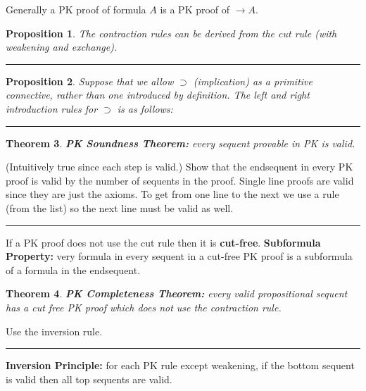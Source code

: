 \documentclass[twoside]{article}
\newcounter{lecnum}
\newtheorem{theorem}{Theorem}[lecnum]
\newtheorem{proposition}[theorem]{Proposition}
\newenvironment{proof}{{\bf Proof:}}{\hfill\rule{2mm}{2mm}}
\begin{document}
Generally a PK proof of formula $A$ is a PK proof of $\rightarrow A$. 

\begin{proposition}
The contraction rules can be derived from the cut rule (with weakening and exchange).
\end{proposition}
\begin{proof}

\end{proof}

\begin{proposition}
Suppose that we allow $\supset$ (implication) as a primitive connective, rather than one introduced by definition. The left and right introduction rules for $\supset$ is as follows:

\end{proposition}
\begin{proof}

\end{proof}

\begin{theorem}
\textbf{PK Soundness Theorem:} every sequent provable in PK is valid.
\end{theorem}
\begin{proof}
(Intuitively true since each step is valid.) Show that the endsequent in every PK proof is valid by the number of sequents in the proof. Single line proofs are valid since they are just the axioms. To get from one line to the next we use a rule (from the list) so the next line must be valid as well. 
\end{proof}

If a PK proof does not use the cut rule then it is \textbf{cut-free}. \textbf{Subformula Property:} very formula in every sequent in a cut-free PK proof is a subformula of a formula in the endsequent. 

\begin{theorem}
\textbf{PK Completeness Theorem:} every valid propositional sequent has a cut free PK proof which does not use the contraction rule.
\end{theorem}
\begin{proof}
Use the inversion rule. 
\end{proof}

\textbf{Inversion Principle:} for each PK rule except weakening, if the bottom sequent is valid then all top sequents are valid. 
\end{document}
